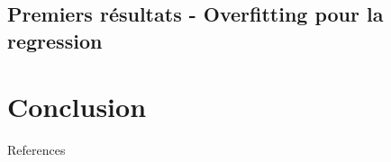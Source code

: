 \documentclass[xcolor=table, 8pt]{beamer}
\begin{document}
    \subsection{Premiers résultats - Overfitting pour la regression}\label{subsec:results-loracurves}
    


    \section{Conclusion}
    


    \begin{frame}[allowframebreaks=]{References}
        \printbibliography
    \end{frame}
\end{document}
